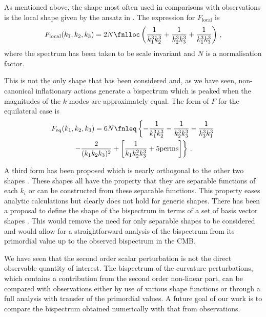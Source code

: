 As mentioned above, the shape most often used in comparisons with observations is the local shape
given by the
ansatz in . The expression for $F_\mathrm{local}$ is
\cite{Babich:2004gb, Komatsu:2010fb}
% 
\begin{equation}
 F_\mathrm{local}(k_1,k_2,k_3) = 2N\fnlloc \left(\frac{1}{k_1^3 k_2^3}
                                  +\frac{1}{k_2^3 k_3^3} + \frac{1}{k_1^3 k_3^3}\right) \,,
\end{equation}
% 
where the spectrum has been taken to be scale invariant and $N$ is a normalisation factor. 

This is not the only shape
that has been considered and, as we have seen, non-canonical inflationary actions generate a
bispectrum which is peaked
when the magnitudes of the $k$ modes are approximately equal. The form of $F$ for the equilateral
case is \cite{Komatsu:2010fb}
% 
\begin{multline}
 F_\mathrm{eq}(k_1,k_2,k_3) = 6 N \fnleq \left\{ -\frac{1}{k_1^3 k_2^3} -\frac{1}{k_2^3 k_3^3}
                                -\frac{1}{k_3^3 k_1^3}  \right.\\
                                \left.-\frac{2}{(k_1 k_2 k_3)^2}  + \left[ \frac{1}{k_1 k_2^2 k_3^3}
+ \mathrm{5 perms} \right]
                                \right\} \,.
\end{multline}
% 

A third form has been proposed which is nearly orthogonal to the other two shapes
\cite{Senatore:2009gt}. These shapes all have the property that they are separable functions of
each $k_i$ or can be constructed from these separable functions. This property eases analytic
calculations but clearly does not hold for generic shapes. 
% 
There has been a proposal to define the
shape of the bispectrum in terms of a set of basis vector shapes
\cite{Fergusson:2009nv,Liguori:2010hx}. This would remove the need for only separable shapes to be
considered and would allow for a straightforward analysis of the bispectrum from its primordial
value up to the observed bispectrum in the CMB. 

We have seen that the second order scalar perturbation is not the direct observable quantity of
interest. The bispectrum of the curvature perturbations, which contains a contribution from the
second order non-linear part, can be compared with observations either by use of various
shape functions or through a full analysis with transfer of the primordial values. A future goal of
our work is to compare the bispectrum obtained numerically with that from observations.



